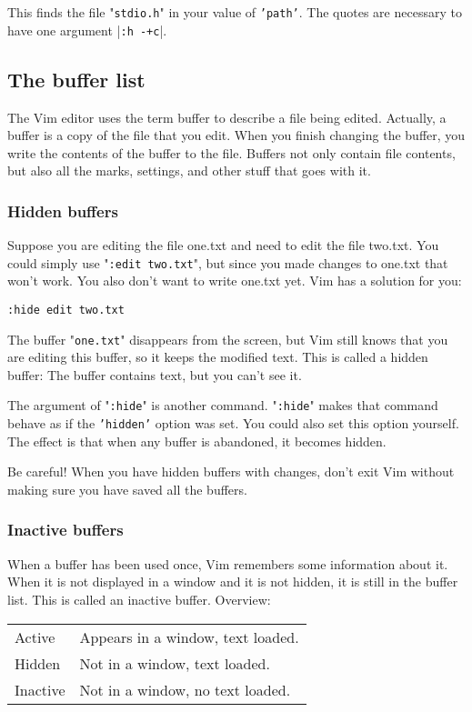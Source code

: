 This finds the file "\texttt{stdio.h}" in your value of \texttt{'path'}.
The quotes are necessary to have one argument |\texttt{:h -+c}|.
\subsection{The buffer list}
\label{The buffer list}
The Vim editor uses the term buffer to describe a file being edited.
Actually, a buffer is a copy of the file that you edit.
When you finish changing the buffer, you write the contents of the buffer to the file.
Buffers not only contain file contents, but also all the marks, settings, and other stuff that goes with it.
\subsubsection{Hidden buffers}
Suppose you are editing the file one.txt and need to edit the file two.txt.
You could simply use "\texttt{:edit two.txt}", but since you made changes to one.txt that won't work.
You also don't want to write one.txt yet.
Vim has a solution for you:

\begin{Verbatim}[samepage=true]
 :hide edit two.txt
\end{Verbatim}

The buffer "\texttt{one.txt}" disappears from the screen, but Vim still knows that you are editing this buffer, so it keeps the modified text.
This is called a hidden buffer: The buffer contains text, but you can't see it.

The argument of "\texttt{:hide}" is another command.
"\texttt{:hide}" makes that command behave as if the \texttt{'hidden'} option was set.
You could also set this option yourself.
The effect is that when any buffer is abandoned, it becomes hidden.

Be careful!  When you have hidden buffers with changes, don't exit Vim without making sure you have saved all the buffers.
\subsubsection{Inactive buffers}
When a buffer has been used once, Vim remembers some information about it.
When it is not displayed in a window and it is not hidden, it is still in the buffer list.
This is called an inactive buffer.
Overview:

\begin{center} \begin{tabular}{l l}
				Active & Appears in a window, text loaded. \\
				Hidden & Not in a window, text loaded. \\
				Inactive & Not in a window, no text loaded. \\
\end{tabular} \end{center}

